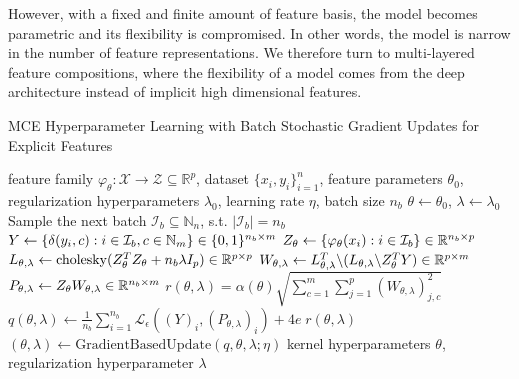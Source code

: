 \documentclass[runningheads, envcountsame, a4paper]{llncs}
\begin{document}
			However, with a fixed and finite amount of feature basis, the model becomes parametric and its flexibility is compromised. In other words, the model is narrow in the number of feature representations. We therefore turn to multi-layered feature compositions, where the flexibility of a model comes from the deep architecture instead of implicit high dimensional features.
			
			\begin{algorithm}[tb]
				\caption{\gls{MCE} Hyperparameter Learning with Batch Stochastic Gradient Updates for Explicit Features}
				\label{alg:explicit_multiclass_conditional_embedding_training}
				\begin{algorithmic}[1]
					 feature family $\varphi_{\theta} : \mathcal{X} \to \mathcal{Z} \subseteq \mathbb{R}^{p}$, dataset $\{x_{i}, y_{i}\}_{i = 1}^{n}$, feature parameters $\theta_{0}$, regularization hyperparameters $\lambda_{0}$, learning rate $\eta$, batch size $n_{b}$
					\STATE $\theta \leftarrow \theta_{0}$, $\lambda \leftarrow \lambda_{0}$
					\REPEAT
					\STATE Sample the next batch $\mathcal{I}_{b} \subseteq \mathbb{N}_{n}$, s.t. $| \mathcal{I}_{b} | = n_{b}$ \hspace{\fill} %
					\STATE $Y \leftarrow \{\delta(y_{i}, c) : i \in \mathcal{I}_{b}, c \in \mathbb{N}_{m}\} \hspace{\fill} \in \{0, 1\}^{n_{b} \times m}$
					\STATE $Z_{\theta} \leftarrow \{\varphi_{\theta}(x_{i}) : i \in \mathcal{I}_{b}\} \hspace{\fill} \in \mathbb{R}^{n_{b} \times p}$
					\STATE $L_{\theta, \lambda} \leftarrow \mathrm{cholesky}(Z_{\theta}^{T} Z_{\theta} + n_{b} \lambda I_{p}) \hspace{\fill} \in \mathbb{R}^{p \times p}$
					\STATE $W_{\theta, \lambda} \leftarrow L_{\theta, \lambda}^{T} \backslash (L_{\theta, \lambda} \backslash Z_{\theta}^{T} Y) \hspace{\fill} \in \mathbb{R}^{p \times m}$
					\STATE $P_{\theta, \lambda} \leftarrow Z_{\theta} W_{\theta, \lambda} \hspace{\fill} \in \mathbb{R}^{n_{b} \times m}$
					\STATE $r(\theta, \lambda) = \alpha(\theta) \sqrt{\sum_{c = 1}^{m} \sum_{j = 1}^{p} (W_{\theta, \lambda})_{j, c}^{2}}$
					\STATE $q(\theta, \lambda) \leftarrow \frac{1}{n_{b}} \sum_{i = 1}^{n_{b}} \mathcal{L}_{\epsilon}((Y)_{i}, (P_{\theta, \lambda})_{i}) + 4 e \; r(\theta, \lambda)$
					\STATE $(\theta, \lambda) \leftarrow \mathrm{GradientBasedUpdate}(q, \theta, \lambda; \eta)$ %
					 kernel hyperparameters $\theta$, regularization hyperparameter $\lambda$
				\end{algorithmic}
			\end{algorithm}
	
\end{document}
